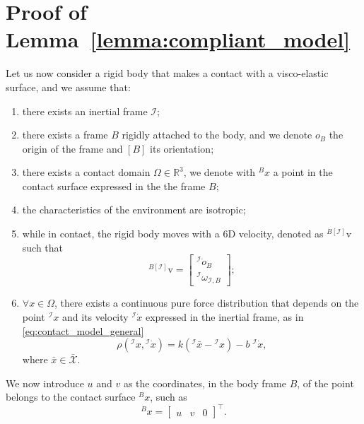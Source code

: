 \chapter{Proof of Lemma~\ref{lemma:compliant_model}\label{appendix:proof_lemma_compliant}} 

Let us now consider a rigid body that makes a contact with a visco-elastic surface, and we assume that:
\begin{enumerate}
    \item there exists an inertial frame $\mathcal{I}$;
    \item there exists a frame $B$ rigidly attached to the body, and we denote $o_B$ the origin of the frame and $[B]$ its orientation;
    \item there exists a contact domain $\Omega \in \mathbb{R}^3$, we denote with ${}^B x$ a point in the contact surface expressed in the the frame $B$;
    \item the characteristics of the environment are isotropic;
    \item while in contact, the rigid body moves with a 6D velocity, denoted as ${}^{B[\mathcal{I}]} \mathrm{v}$ such that 
    \begin{equation}
    {}^{B[\mathcal{I}]} \mathrm{v} = 
    \begin{bmatrix}
       {}^\mathcal{I}\dot{o}_B \\
       {}^\mathcal{I}\omega_{\mathcal{I},B}
    \end{bmatrix} ;
    \end{equation} 
    \item  $\forall x \in \Omega$, there exists a continuous pure force distribution that depends on the point ${}^\mathcal{I} x$ and its velocity ${}^\mathcal{I} \dot{x}$ expressed in the inertial frame, as in \eqref{eq:contact_model_general}
    \begin{equation}
        \label{eq:contact_model_general_appendix}
        \rho\left({}^\mathcal{I} x, {}^\mathcal{I} \dot{x}\right) = k \left( {}^\mathcal{I} \bar{x} - {}^\mathcal{I} x\right) - b \; {}^\mathcal{I} \dot{x},
    \end{equation}
    where $\bar{x} \in \bar{\mathcal{X}}$.
\end{enumerate}
We now introduce $u$ and $v$ as the coordinates, in the body frame $B$, of the point belongs to the contact surface ${}^ B x$, such as 
\begin{equation}
    {}^ B x = \begin{bmatrix} u & v & 0 \end{bmatrix}^\top.
\end{equation}

